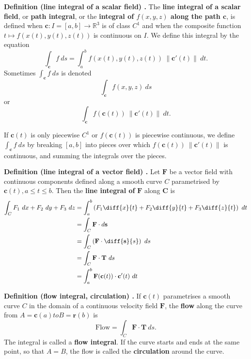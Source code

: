\begin{shaded}
\textbf{Definition (line integral of a scalar field) \cite{marsden_vector_calculus}.} The \textbf{line integral of a scalar field}, or \textbf{path integral}, or the \textbf{integral of $f(x, y, z)$ along the path $\mathbf{c}$}, is defined when $\mathbf{c}: I = [a, b] \to \mathbb{R}^3$ is of class $C^1$ and when the composite function $t \mapsto f(x(t), y(t), z(t))$ is continuous on $I$. We define this integral by the equation
$$ \int_{\mathbf{c}} f \ ds = \int_a^b f(x(t), y(t), z(t)) \ \lVert \mathbf{c}'(t) \rVert \ dt . $$
Sometimes $\int_\mathbf{c} f \ ds$ is denoted
$$ \int_\mathbf{c} f(x, y, z) \ ds $$
or
$$ \int_\mathbf{c} f(\mathbf{c}(t)) \ \lVert \mathbf{c}'(t) \rVert \ dt . $$

If $\mathbf{c}(t)$ is only piecewise $C^1$ or $f(\mathbf{c}(t))$ is piecewise continuous, we define $\int_\mathbf{c} f \ ds$ by breaking $[a, b]$ into pieces over which $f(\mathbf{c}(t)) \ \lVert \mathbf{c}'(t) \rVert$ is continuous, and summing the integrals over the pieces.
\end{shaded}

\begin{shaded}
\textbf{Definition (line integral of a vector field) \cite{thomas_calculus}.} Let $\mathbf{F}$ be a vector field with continuous components defined along a smooth curve $C$ parametrised by $\mathbf{c}(t), a \leq t \leq b$. Then the \textbf{line integral of} $\mathbf{F}$ along $\mathbf{C}$ is
\begin{align*}
\int_C F_1 \ dx + F_2 \ dy + F_3 \ dz &= \int_a^b \left( F_1 \diff{x}{t} + F_2 \diff{y}{t} + F_3 \diff{z}{t} \right) \ dt \\
&= \int_C \mathbf{F} \cdot d \mathbf{s} \\
&= \int_C \left( \mathbf{F} \cdot \diff{\mathbf{s}}{s} \right) \ ds \\
&= \int_C \mathbf{F} \cdot \mathbf{T} \ ds \\
&= \int_a^b \mathbf{F}(\mathbf{c}(t)) \cdot \mathbf{c}'(t) \ dt
\end{align*}

\textbf{Definition (flow integral, circulation) \cite{thomas_calculus}.} If $\mathbf{c}(t)$ parametrises a smooth curve $C$ in the domain of a continuous velocity field $\mathbf{F}$, the \textbf{flow} along the curve from $A = \mathbf{c}(a) to B = \mathbf{r}(b)$ is
$$ \text{Flow} = \int_C \mathbf{F} \cdot \mathbf{T} \ ds . $$
The integral is called a \textbf{flow integral}. If the curve starts and ends at the same point, so that $A = B$, the flow is called the \textbf{circulation} around the curve.
\end{shaded}

